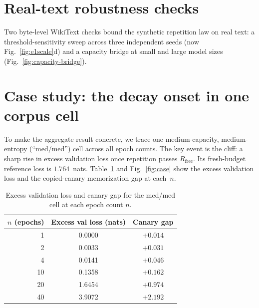\documentclass[11pt]{article}
\begin{document}
\appendix
\setcounter{figure}{0}
\setcounter{table}{0}
\renewcommand{\theHfigure}{A\arabic{figure}}
\renewcommand{\theHtable}{A\arabic{table}}
\section{Real-text robustness checks}\label{app:robustness}

Two byte-level WikiText checks bound the synthetic repetition law on real text: a
threshold-sensitivity sweep across three independent seeds (now
Fig.~\ref{fig:e1scale}d) and a capacity bridge at small and large
model sizes (Fig.~\ref{fig:capacity-bridge}).

\section{Case study: the decay onset in one corpus cell}\label{sec:casestudy}

To make the aggregate result concrete, we trace one medium-capacity,
medium-entropy (``med/med'') cell across all epoch counts. The key event is the
cliff: a sharp rise in excess validation loss once repetition passes
$R_{\mathrm{free}}$. Its fresh-budget reference loss is $1.764$~nats.
Table~\ref{tab:casestudy} and Fig.~\ref{fig:case} show the excess validation
loss and the copied-canary memorization gap at each~$n$.

\begin{table}[htbp]
\centering
\caption{Excess validation loss and canary gap for the med/med cell at each epoch count
$n$.}
\label{tab:casestudy}
\begin{tabular}{rcc}
\toprule
$n$ (epochs) & Excess val loss (nats) & Canary gap \\
\midrule
1  & 0.0000 & $+0.014$ \\
2  & 0.0033 & $+0.031$ \\
4  & 0.0141 & $+0.046$ \\
10 & 0.1358 & $+0.162$ \\
20 & 1.6454 & $+0.974$ \\
40 & 3.9072 & $+2.192$ \\
\bottomrule
\end{tabular}
\end{table}
\end{document}
